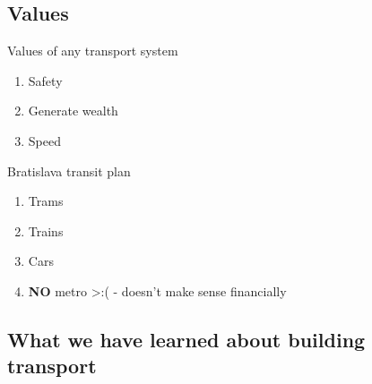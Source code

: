 \subsection{Values}

\begin{frame}
	\large
	{\Large Values of any transport system}
	\begin{enumerate}
		\item Safety
		\item Generate wealth
		\item Speed
	\end{enumerate}
	\vspace{1em}
	{\Large Bratislava transit plan}
	\begin{enumerate}
		\item Trams
		\item Trains
		\item Cars
		\item \textbf{NO} metro >:( - doesn't make sense financially
	\end{enumerate}
\end{frame}

\subsection{What we have learned about building transport}

